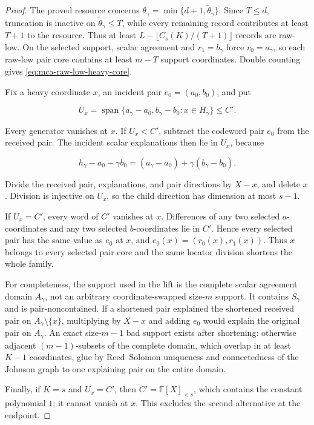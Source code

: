 \documentclass[11pt,a4paper]{amsart}
\numberwithin{equation}{section}
\theoremstyle{remark}
\newcommand{\F}{\mathbb F}\newcommand{\B}{\mathbb B}\newcommand{\K}{\mathbb K}\newcommand{\Z}{\mathbb Z}
\begin{document}
\begin{proof}
The proved resource concerns
\(\theta_\gamma=\min\{d+1,\widetilde\theta_\gamma\}\).  Since \(T\le d\),
truncation is inactive on \(\widetilde\theta_\gamma\le T\), while every
remaining record contributes at least \(T+1\) to the resource.  Thus at
least \(L-\lfloor C_s(K)/(T+1)\rfloor\) records are raw-low.  On the selected
support, scalar agreement and \(r_1=b_\gamma\) force
\(r_0=a_\gamma\), so each raw-low pair core contains at least \(m-T\)
support coordinates.  Double counting gives \eqref{eq:mca-raw-low-heavy-core}.

Fix a heavy coordinate \(x\), an incident pair
\(e_0=(a_0,b_0)\), and put

\[
 U_x=\operatorname{span}\{a_\gamma-a_0,b_\gamma-b_0:
 x\in H_\gamma\}\le C'.
\]

Every generator vanishes at \(x\).  If \(U_x<C'\), subtract the codeword
pair \(e_0\) from the received pair.  The incident scalar explanations then
lie in \(U_x\), because

\[
 h_\gamma-a_0-\gamma b_0
 =(a_\gamma-a_0)+\gamma(b_\gamma-b_0).
\]

Divide the received pair, explanations, and pair directions by \(X-x\), and
delete \(x\).  Division is injective on \(U_x\), so the child direction has
dimension at most \(s-1\).

If \(U_x=C'\), every word of \(C'\) vanishes at \(x\).  Differences of any
two selected \(a\)-coordinates and any two selected \(b\)-coordinates lie
in \(C'\).  Hence every selected pair has the same value as \(e_0\) at
\(x\), and \(e_0(x)=(r_0(x),r_1(x))\).  Thus \(x\) belongs to every selected
pair core and the same locator division shortens the whole family.

For completeness, the support used in the lift is the complete scalar
agreement domain \(A_\gamma\), not an arbitrary coordinate-swapped
size-\(m\) support.  It contains \(S_\gamma\) and is pair-noncontained.  If a
shortened pair explained the shortened received pair on
\(A_\gamma\setminus\{x\}\), multiplying by \(X-x\) and adding \(e_0\)
would explain the original pair on \(A_\gamma\).  An exact size-\(m-1\) bad
support exists after shortening: otherwise adjacent \((m-1)\)-subsets of
the complete domain,
which overlap in at least \(K-1\) coordinates, glue by Reed--Solomon
uniqueness and connectedness of the Johnson graph to one explaining pair on
the entire domain.

Finally, if \(K=s\) and \(U_x=C'\), then \(C'=\F[X]_{<s}\), which contains
the constant polynomial \(1\); it cannot vanish at \(x\).  This excludes the
second alternative at the endpoint.
\end{proof}
\end{document}
